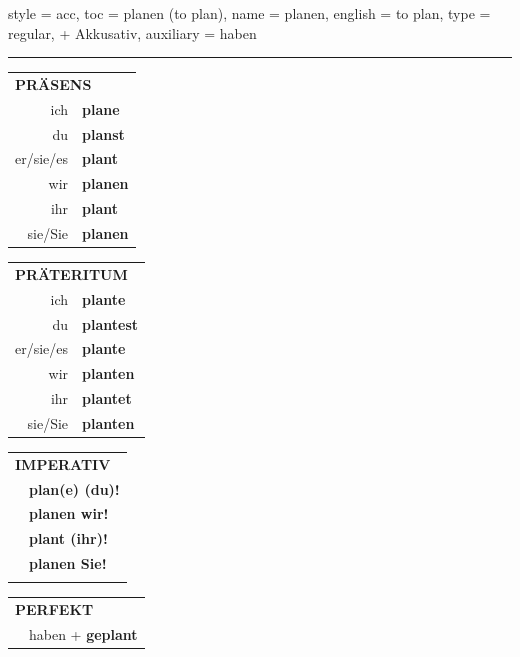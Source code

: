 \begin{verbentry}{
  style = {acc},
  toc = {planen (to plan)},
  name = {planen},
  english = {to plan},
  type = {regular, + Akkusativ},
  auxiliary = {haben}
}
 
    
     \vspace{5pt}

    \hrule
    
    \vspace{5pt}

  \begin{tabular}{rl}
     \multicolumn{2}{l}{\textbf{PRÄSENS} }\\
    ich & \textbf{plane}\\
    du & \textbf{planst}\\
    er/sie/es & \textbf{plant}\\
    wir & \textbf{planen}\\
    ihr & \textbf{plant}\\
    sie/Sie & \textbf{planen}\\
  \end{tabular}
  \hfill
     \begin{tabular}{rl}
    \multicolumn{2}{l}{\textbf{PRÄTERITUM} }\\
    ich & \textbf{plante}\\
    du & \textbf{plantest}\\
    er/sie/es & \textbf{plante}\\
    wir & \textbf{planten}\\
    ihr & \textbf{plantet}\\
    sie/Sie & \textbf{planten}\\
  \end{tabular}
  \hfill
  \begin{tabular}{rl}
     \multicolumn{2}{l}{\textbf{IMPERATIV} }\\
   & \textbf{plan(e) (du)!}\\
   & \textbf{planen wir!}\\
   & \textbf{plant (ihr)!}\\
   & \textbf{planen Sie!}\\
   & \vspace{10pt}
  \end{tabular}

    \vspace{10pt}

 \begin{tabular}{rl}
     \multicolumn{2}{l}{\textbf{PERFEKT}}\\
   & haben + \textbf{geplant}\\
  \end{tabular}
\hfill
   \begin{tabular}{rl}
   

\end{tabular}
\end{verbentry}
